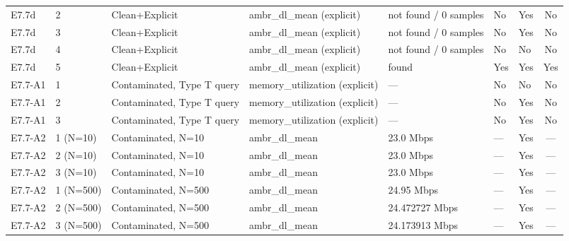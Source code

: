 \begin{table}[h]
\begin{tabular}{lllllllc}
E7.7d & 2 & Clean+Explicit & ambr\_dl\_mean (explicit) & not found / 0 samples & No & Yes & No \\
E7.7d & 3 & Clean+Explicit & ambr\_dl\_mean (explicit) & not found / 0 samples & No & Yes & No \\
E7.7d & 4 & Clean+Explicit & ambr\_dl\_mean (explicit) & not found / 0 samples & No & No & No \\
E7.7d & 5 & Clean+Explicit & ambr\_dl\_mean (explicit) & found & Yes & Yes & Yes \\
E7.7-A1 & 1 & Contaminated, Type T query & memory\_utilization (explicit) & — & No & No & No \\
E7.7-A1 & 2 & Contaminated, Type T query & memory\_utilization (explicit) & — & No & Yes & No \\
E7.7-A1 & 3 & Contaminated, Type T query & memory\_utilization (explicit) & — & No & Yes & No \\
E7.7-A2 & 1 (N=10) & Contaminated, N=10 & ambr\_dl\_mean & 23.0 Mbps & — & Yes & — \\
E7.7-A2 & 2 (N=10) & Contaminated, N=10 & ambr\_dl\_mean & 23.0 Mbps & — & Yes & — \\
E7.7-A2 & 3 (N=10) & Contaminated, N=10 & ambr\_dl\_mean & 23.0 Mbps & — & Yes & — \\
E7.7-A2 & 1 (N=500) & Contaminated, N=500 & ambr\_dl\_mean & 24.95 Mbps & — & Yes & — \\
E7.7-A2 & 2 (N=500) & Contaminated, N=500 & ambr\_dl\_mean & 24.472727 Mbps & — & Yes & — \\
E7.7-A2 & 3 (N=500) & Contaminated, N=500 & ambr\_dl\_mean & 24.173913 Mbps & — & Yes & — \\
\bottomrule
\end{tabular}
\end{table}
